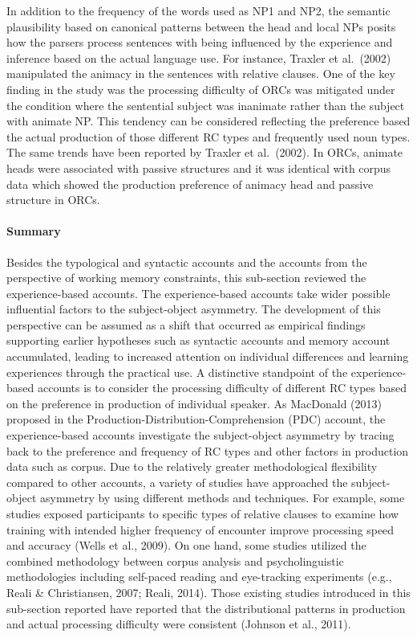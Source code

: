 \documentclass[
]{article}
\begin{document}
In addition to the frequency of the words used as NP1 and NP2, the
semantic plausibility based on canonical patterns between the head and
local NPs posits how the parsers process sentences with being influenced
by the experience and inference based on the actual language use. For
instance, Traxler et al.~(2002) manipulated the animacy in the sentences
with relative clauses. One of the key finding in the study was the
processing difficulty of ORCs was mitigated under the condition where
the sentential subject was inanimate rather than the subject with
animate NP. This tendency can be considered reflecting the preference
based the actual production of those different RC types and frequently
used noun types. The same trends have been reported by Traxler et
al.~(2002). In ORCs, animate heads were associated with passive
structures and it was identical with corpus data which showed the
production preference of animacy head and passive structure in ORCs.

\paragraph{Summary}\label{summary-2}

Besides the typological and syntactic accounts and the accounts from the
perspective of working memory constraints, this sub-section reviewed the
experience-based accounts. The experience-based accounts take wider
possible influential factors to the subject-object asymmetry. The
development of this perspective can be assumed as a shift that occurred
as empirical findings supporting earlier hypotheses such as syntactic
accounts and memory account accumulated, leading to increased attention
on individual differences and learning experiences through the practical
use. A distinctive standpoint of the experience-based accounts is to
consider the processing difficulty of different RC types based on the
preference in production of individual speaker. As MacDonald (2013)
proposed in the Production-Distribution-Comprehension (PDC) account, the
experience-based accounts investigate the subject-object asymmetry by
tracing back to the preference and frequency of RC types and other
factors in production data such as corpus. Due to the relatively greater
methodological flexibility compared to other accounts, a variety of
studies have approached the subject-object asymmetry by using different
methods and techniques. For example, some studies exposed participants
to specific types of relative clauses to examine how training with
intended higher frequency of encounter improve processing speed and
accuracy (Wells et al., 2009). On one hand, some studies utilized the
combined methodology between corpus analysis and psycholinguistic
methodologies including self-paced reading and eye-tracking experiments
(e.g., Reali \& Christiansen, 2007; Reali, 2014). Those existing studies
introduced in this sub-section reported have reported that the
distributional patterns in production and actual processing difficulty
were consistent (Johnson et al., 2011).
\end{document}
